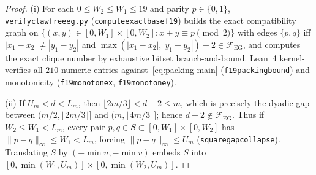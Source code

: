 \documentclass[11pt,reqno]{amsart}
\theoremstyle{plain}
\theoremstyle{definition}
\theoremstyle{remark}
\newcommand{\FEG}{\mathcal{F}_{\mathrm{EG}}}
\DeclareRobustCommand{\_}{\ifmmode\text{\textunderscore}\else\textunderscore\allowbreak\fi}
\begin{document}
\begin{proof}
(i) For each $0 \le W_2 \le W_1 \le 19$ and parity $p \in \{0, 1\}$, \texttt{verify\_clawfree\_eg.py} (\texttt{compute\_exact\_base\_f19}) builds the exact compatibility graph on $\{(x, y) \in [0, W_1] \times [0, W_2] : x + y \equiv p \pmod 2\}$ with edges $\{p, q\}$ iff $|x_1 - x_2| \neq |y_1 - y_2|$ and $\max(|x_1 - x_2|, |y_1 - y_2|) + 2 \in \FEG$, and computes the exact clique number by exhaustive bitset branch-and-bound. Lean~4 kernel-verifies all $210$ numeric entries against~\eqref{eq:packing-main} (\texttt{f19\_packing\_bound}) and monotonicity (\texttt{f19\_monotone\_x}, \texttt{f19\_monotone\_y}).

(ii) If $U_m < d < L_m$, then $\lfloor 2m/3 \rfloor < d + 2 \le m$, which is precisely the dyadic gap between $(m/2, \lfloor 2m/3 \rfloor]$ and $(m, \lfloor 4m/3 \rfloor]$; hence $d + 2 \notin \FEG$. Thus if $W_2 \le W_1 < L_m$, every pair $p, q \in S \subset [0, W_1] \times [0, W_2]$ has $\|p - q\|_\infty \le W_1 < L_m$, forcing $\|p - q\|_\infty \le U_m$ (\texttt{square\_gap\_collapse}). Translating $S$ by $(-\min u, -\min v)$ embeds $S$ into $[0, \min(W_1, U_m)] \times [0, \min(W_2, U_m)]$.
\end{proof}
\end{document}
